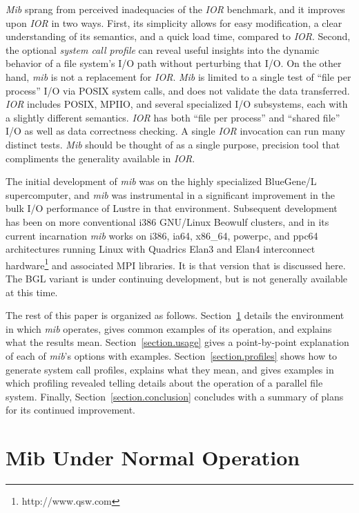 \documentclass{article}
\begin{document}
{\em Mib} sprang from perceived inadequacies of the {\em IOR}
benchmark, and it improves upon {\em IOR} in two ways.  First, its
simplicity allows for easy modification, a clear understanding of its
semantics, and a quick load time, compared to {\em IOR}.  Second, the
optional {\em system call profile} can reveal useful insights into the
dynamic behavior of a file system's I/O path without perturbing that
I/O.  On the other hand, {\em mib} is not a replacement for {\em IOR}.
{\em Mib} is limited to a single test of ``file per process'' I/O via
POSIX system calls, and does not validate the data transferred.  {\em
IOR} includes POSIX, MPIIO, and several specialized I/O subsystems,
each with a slightly different semantics.  {\em IOR} has both ``file
per process'' and ``shared file'' I/O as well as data correctness
checking.  A single {\em IOR} invocation can run many distinct tests.
{\em Mib} should be thought of as a single purpose, precision tool
that compliments the generality available in {\em IOR}.

The initial development of {\em mib} was on the highly specialized
BlueGene/L supercomputer, and {\em mib} was instrumental in a
significant improvement in the bulk I/O performance of Lustre in that
environment.  Subsequent development has been on more conventional
i386 GNU/Linux Beowulf clusters, and in its current incarnation {\em
  mib} works on i386, ia64, x86\_64, powerpc, and ppc64 architectures
running Linux with Quadrics Elan3 and Elan4 interconnect 
hardware\footnote{http://www.qsw.com} and associated MPI libraries.
It is that version that is discussed here.  The BGL variant is under
continuing development, but is not generally available at this time.

The rest of this paper is organized as follows.
Section~\ref{section.normal} details the environment in which {\em
  mib} operates, gives common examples of its operation, and explains
what the results mean.  Section~\ref{section.usage} gives a
point-by-point explanation of each of {\em mib}'s options with examples.
Section~\ref{section.profiles} shows how to generate system call
profiles, explains what they mean, and gives examples in
which profiling revealed telling details about the operation of a
parallel file system.  Finally, Section~\ref{section.conclusion}
concludes with a summary of plans for its continued improvement.

\section{Mib Under Normal Operation}\label{section.normal}
\end{document}
